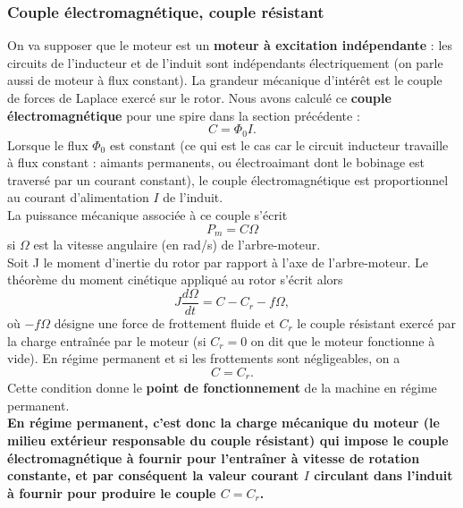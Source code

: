 \documentclass[11pt,a4paper]{report}
\begin{document}
\subsubsection*{Couple électromagnétique, couple résistant}

On va supposer que le moteur est un \textbf{moteur à excitation indépendante} : les circuits de l'inducteur et de l'induit sont indépendants électriquement (on parle aussi de moteur à flux constant). La grandeur mécanique d'intérêt est le couple de forces de Laplace exercé sur le rotor. Nous avons calculé ce \textbf{couple électromagnétique} pour une spire dans la section précédente :
\begin{equation}
	C = \Phi_0 I.
\end{equation}
Lorsque le flux $\Phi_0$ est constant (ce qui est le cas car le circuit inducteur travaille à flux constant : aimants permanents, ou électroaimant dont le bobinage est traversé par un courant constant), le couple électromagnétique est proportionnel au courant d'alimentation $I$ de l'induit.\\

La puissance mécanique associée à ce couple s'écrit
\begin{equation}
	P_m = C\Omega
\end{equation}
si $\Omega$ est la vitesse angulaire (en rad/s) de l'arbre-moteur.\\ 

Soit J le moment d'inertie du rotor par rapport à l'axe de l'arbre-moteur. Le théorème du moment cinétique appliqué au rotor s'écrit alors
\begin{equation}
	J\frac{d\Omega}{dt} = C - C_r - f\Omega,
\end{equation}
où $-f\Omega$ désigne une force de frottement fluide et $C_r$ le couple résistant exercé par la charge entraînée par le moteur (si $C_r = 0$ on dit que le moteur fonctionne à vide). En régime permanent et si les frottements sont négligeables, on a
\begin{equation}
	C = C_r.
\end{equation}
Cette condition donne le \textbf{point de fonctionnement} de la machine en régime permanent.\\

\textbf{En régime permanent, c'est donc la charge mécanique du moteur (le milieu extérieur responsable du couple résistant) qui impose le couple électromagnétique à fournir pour l'entraîner à vitesse de rotation constante, et par conséquent la valeur courant $I$ circulant dans l'induit à fournir pour produire le couple $C = C_r$.}
 
\end{document}

